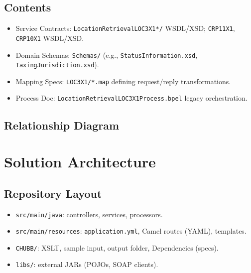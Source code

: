 \documentclass[11pt]{article}
\begin{document}
\subsection{Contents}
\begin{itemize}
  \item Service Contracts: \texttt{LocationRetrievalLOC3X1*/} WSDL/XSD; \texttt{CRP11X1}, \texttt{CRP10X1} WSDL/XSD.
  \item Domain Schemas: \texttt{Schemas/} (e.g., \texttt{StatusInformation.xsd}, \texttt{TaxingJurisdiction.xsd}).
  \item Mapping Specs: \texttt{LOC3X1/*.map} defining request/reply transformations.
  \item Process Doc: \texttt{LocationRetrievalLOC3X1Process.bpel} legacy orchestration.
\end{itemize}

\subsection{Relationship Diagram}
\begin{center}
\end{center}

\section{Solution Architecture}
\subsection{Repository Layout}
\begin{itemize}
  \item \texttt{src/main/java}: controllers, services, processors.
  \item \texttt{src/main/resources}: \texttt{application.yml}, Camel routes (YAML), templates.
  \item \texttt{CHUBB/}: XSLT, sample input, output folder, Dependencies (specs).
  \item \texttt{libs/}: external JARs (POJOs, SOAP clients).
\end{itemize}
\end{document}
